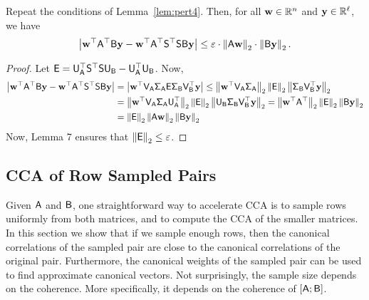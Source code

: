 \begin{lemma}\label{lem:pert6}
Repeat the conditions of Lemma~\ref{lem:pert4}.
Then, for all $\w \in \R^n$ and $\y \in \R^{\ell}$, we have
\[
\abs{ \w^\top \matA^\top \matB \y - \w^\top \matA^\top \matS^\top \matS \matB \y  } \leq \eps \cdot \norm{\matA \w} \cdot \norm{\matB \y}.
\]
\end{lemma}
\begin{proof}
Let $\matE =  \matU_{\matA}^\top \matS^\top \matS \matU_{\matB} - \matU_{\matA}^\top \matU_{\matB}$. Now,
\begin{align*}
\abs{ \w^\top \matA^\top \matB \y - \w^\top \matA^\top \matS^\top \matS \matB \y  } & =   \abs{ \w^\top \matV_{\matA}\matSig_{\matA} \matE \matSig_{\matB} \matV_{\matB}^\top \y  }
\leq  \norm{\w^\top \matV_{\matA}\matSig_{\matA}} \norm{\matE} \norm{\matSig_{\matB} \matV_{\matB}^\top \y}\\
&=    \norm{\w^\top \matV_{\matA}\matSig_{\matA}\matU_{\matA}^\top} \norm{\matE} \norm{\matU_{\matB}\matSig_{\matB} \matV_{\matB}^\top \y}
=    \norm{\w^\top \matA^\top} \norm{\matE} \norm{\matB \y}\\
&=    \norm{\matE}  \norm{\matA \w} \norm{\matB \y}
\end{align*}
Now, Lemma 7
ensures that $\norm{\matE} \le \eps$.
\end{proof}

%
\subsection{CCA of Row Sampled Pairs}
%

Given $\matA$ and $\matB$, one straightforward way to accelerate CCA is to sample rows uniformly from both matrices, and to compute the CCA of the smaller matrices. %
In this section we show that if we sample enough rows, then the canonical correlations of the sampled pair are close to the canonical correlations of the original pair. Furthermore, the canonical weights of the sampled pair can be used to find approximate canonical vectors. Not surprisingly, the sample size depends on the coherence. More specifically, it depends on the coherence of $[\matA ; \matB]$.

